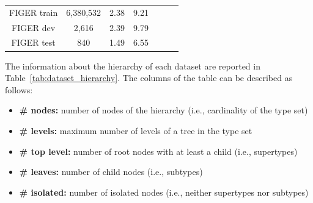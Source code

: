 \begin{table}
{\begin{tabular}{cccclll}
\multicolumn{1}{|c|}{FIGER train}      & 6,380,532                              & 2.38                                            & \multicolumn{1}{c|}{9.21}                                                                          &                                             &                                             &                                                   \\
\multicolumn{1}{|c|}{FIGER dev}        & 2,616                                  & 2.39                                            & \multicolumn{1}{c|}{9.79}                                                                          &                                             &                                             &                                                   \\
\multicolumn{1}{|c|}{FIGER test}       & 840                                    & 1.49                                            & \multicolumn{1}{c|}{6.55}                                                                          &                                             &                                             &                                                   \\ \cline{1-4}
\end{tabular}}
\end{table}

The information about the hierarchy of each dataset are reported in Table~\ref{tab:dataset_hierarchy}. The columns of the table can be described as follows:
\begin{itemize}
    \item \textbf{\# nodes:} number of nodes of the hierarchy (i.e., cardinality of the type set)
    \item \textbf{\# levels:} maximum number of levels of a tree in the type set
    \item \textbf{\# top level:} number of root nodes with at least a child (i.e., supertypes)
    \item \textbf{\# leaves:} number of child nodes (i.e., subtypes)
    \item \textbf{\# isolated:} number of isolated nodes (i.e., neither supertypes nor subtypes)
\end{itemize}

